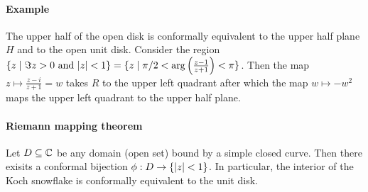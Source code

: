 \paragraph{Example}
The upper half of the open disk is conformally equivalent to the upper half plane $H$ and to the open unit disk. 
Consider the region $\{ z \mid \Im z > 0 \text{ and } \lvert z\rvert < 1 \} = \{ z \mid \pi/2 < \arg \left(\frac{z-1}{z+1}\right) < \pi\}$. Then the map $z \mapsto \frac{z-i}{z+1} = w$ takes $R$ to the upper left quadrant after which the map $w \mapsto -w^2$ maps the upper left quadrant to the upper half plane.

\paragraph{Riemann mapping theorem}
Let $D \subseteq \mathbb{C}$ be any domain (open set) bound by a simple closed curve. Then there exisits a conformal bijection $\phi : D \rightarrow \{ \lvert z\rvert < 1 \}$. In particular, the interior of the Koch snowflake is conformally equivalent to the unit disk.



